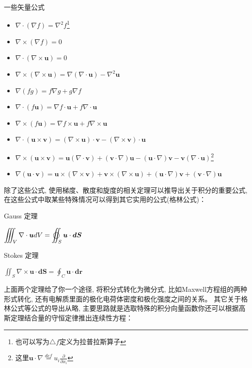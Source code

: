 \begin{theorem}{一些矢量公式}
    \begin{itemize}
        \item $\nabla \cdot (\nabla f)=\nabla^2 f$\footnote[1]{也可以写为$\triangle f$定义为拉普拉斯算子}
        \item $\nabla \times (\nabla f)=0$
        \item $\nabla \cdot (\nabla \times \bm{u})=0$
        \item $\nabla \times (\nabla \times \bm{u})=\nabla(\nabla\cdot \bm{u})-\nabla^2\bm{u}$
        \item $\nabla (fg)=f\nabla g+g\nabla f$
        \item $\nabla \cdot (f\bm{u})=\nabla f \cdot \bm{u} + f\nabla\cdot \bm{u}$
        \item $\nabla \times (f\bm{u})=\nabla f \times \bm{u}+f\nabla\times\bm{u}$
        \item $\nabla \cdot (\bm{u}\times\bm{v})=(\nabla\times\bm{u})\cdot\bm{v}-(\nabla\times\bm{v})\cdot\bm{u}$
        \item $\nabla \times (\bm{u}\times\bm{v})=\bm{u}(\nabla\cdot\bm{v})+(\bm{v}\cdot\nabla)\bm{u}-(\bm{u}\cdot\nabla)\bm{v}-\bm{v}(\nabla\cdot\bm{u})$\footnote[2]{这里$\bm{u}\cdot\nabla\overset{def}{=}u_i\frac{\partial}{\partial x_i}$}
        \item $\nabla(\bm{u}\cdot\bm{v})=\bm{u}\times(\nabla\times\bm{v})+\bm{v}\times(\nabla\times\bm{u})+(\bm{u}\cdot\nabla)\bm{v}+(\bm{v}\cdot\nabla)\bm{u}$
    \end{itemize}
\end{theorem}
除了这些公式, 使用梯度、散度和旋度的相关定理可以推导出关于积分的重要公式, 在这些公式中取某些特殊情况可以得到其它实用的公式(格林公式)：
\begin{theorem}{Gauss 定理}
    \begin{center}
       \begin{math}
            \displaystyle
            \iiint_V \nabla \cdot \bm{u} dV=\varoiint_S \bm{u} \cdot\bm{dS}
        \end{math} 
    \end{center}
\end{theorem}
\begin{theorem}{Stokes 定理}
    \begin{center}
        \begin{math}
            \displaystyle
            \iint_S \nabla \times \bm{u}\cdot\bm{dS}=\oint_C \bm{u}\cdot\bm{dr}
        \end{math}
    \end{center}
\end{theorem}
上面两个定理给了你一个途径, 将积分式转化为微分式, 比如Maxwell方程组的两种形式转化, 还有电解质里面的极化电荷体密度和极化强度之间的关系。
其它关于格林公式等公式的导出从略, 主要思路就是选取特殊的积分向量函数你还可以根据高斯定理结合量的守恒定律推出连续性方程：
\begin{lequation}
\end{lequation}
